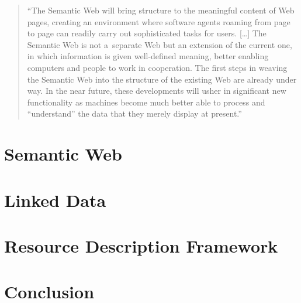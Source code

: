 \begin{quotation}
``The Semantic Web will bring structure to the meaningful content of Web pages,
creating an environment where software agents roaming from page to page
can readily carry out sophisticated tasks for users. [\ldots]
The Semantic Web is not a~separate Web but an extension of the current one,
in which information is given well-defined meaning, better enabling computers and people
to work in cooperation.
The first steps in weaving the Semantic Web into the structure of the existing Web
are already under way.
In the near future, these developments will usher in significant new functionality
as machines become much better able to process and ``understand'' the data
that they merely display at present.''
\end{quotation}

\section{Semantic Web}

\section{Linked Data}

\section{Resource Description Framework}

\section{Conclusion}